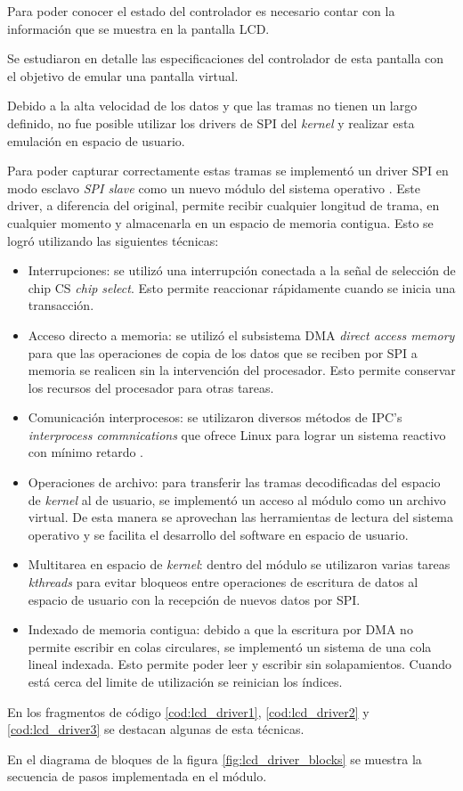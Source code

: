       Para poder conocer el estado del controlador es necesario contar con la información que se muestra en la pantalla LCD.\par
      Se estudiaron en detalle las especificaciones del controlador de esta pantalla con el objetivo de emular una pantalla virtual.\par
      Debido a la alta velocidad de los datos y que las tramas no tienen un largo definido, no fue posible utilizar los drivers de SPI del \textit{kernel} y realizar esta emulación en espacio de usuario.\par
      Para poder capturar correctamente estas tramas se implementó un driver SPI en modo esclavo \textit{SPI slave} como un nuevo módulo del sistema operativo \citep{ldd3}.
      Este driver, a diferencia del original, permite recibir cualquier longitud de trama, en cualquier momento y almacenarla en un espacio de memoria contigua.
      Esto se logró utilizando las siguientes técnicas:
      \begin{itemize}
         \item {Interrupciones: se utilizó una interrupción conectada a la señal de selección de chip CS \textit{chip select}. Esto permite reaccionar rápidamente cuando se inicia una transacción.}
         \item {Acceso directo a memoria: se utilizó el subsistema DMA \textit{direct access memory} para que las operaciones de copia de los datos que se reciben por SPI a memoria se realicen sin la intervención del procesador. Esto permite conservar los recursos del procesador para otras tareas.}
         \item{Comunicación interprocesos: se utilizaron diversos métodos de IPC's \textit{interprocess commnications} que ofrece Linux para lograr un sistema reactivo con mínimo retardo \citep{ldd3}.}
         \item{Operaciones de archivo: para transferir las tramas decodificadas del espacio de \textit{kernel} al de usuario, se implementó un acceso al módulo como un archivo virtual. De esta manera se aprovechan las herramientas de lectura del sistema operativo y se facilita el desarrollo del software en espacio de usuario.}
         \item{Multitarea en espacio de \textit{kernel}: dentro del módulo se utilizaron varias tareas \textit{kthreads} para evitar bloqueos entre operaciones de escritura de datos al espacio de usuario con la recepción de nuevos datos por SPI.}
         \item{Indexado de memoria contigua: debido a que la escritura por DMA no permite escribir en colas circulares, se implementó un sistema de una cola lineal indexada. Esto permite poder leer y escribir sin solapamientos. Cuando está cerca del limite de utilización se reinician los índices.}
      \end{itemize}
      En los fragmentos de código \ref{cod:lcd_driver1}, \ref{cod:lcd_driver2} y \ref{cod:lcd_driver3} se destacan algunas de esta técnicas.\par
      En el diagrama de bloques de la figura \ref{fig:lcd_driver_blocks} se muestra la secuencia de pasos implementada en el módulo.
      
